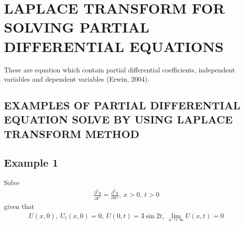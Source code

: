 \documentclass[11pt]{report}
\begin{document}
	
	\section{LAPLACE TRANSFORM FOR SOLVING PARTIAL DIFFERENTIAL EQUATIONS}
	These are equation which contain partial differential coefficients, independent variables and dependent variables (Erwin, 2004).
	
	\subsection{EXAMPLES OF PARTIAL DIFFERENTIAL EQUATION SOLVE BY USING LAPLACE TRANSFORM METHOD}

	\subsection*{Example 1}
	Solve
	\begin{eqnarray}
		\frac{\partial^2 u}{\partial t^2} = \frac{\partial^2 u}{\partial x^2}, ~ x > 0, ~ t > 0 \label{eq:3_7}
	\end{eqnarray}
	given that
	\begin{eqnarray}
		U(x,0),~ U_t(x,0) = 0, ~ U(0,t)=3\sin 2t,~ \lim\limits_{x\rightarrow\infty}U(x,t) = 0\label{eq:3_8}
	\end{eqnarray}
\end{document}
